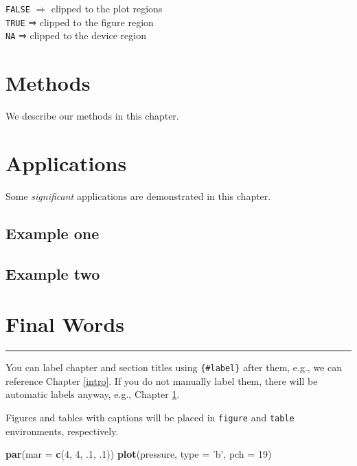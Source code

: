 \documentclass[]{book}
\newenvironment{Shaded}{\begin{snugshade}}{\end{snugshade}}
\newcommand{\KeywordTok}[1]{\textcolor[rgb]{0.13,0.29,0.53}{\textbf{#1}}}
\newcommand{\DataTypeTok}[1]{\textcolor[rgb]{0.13,0.29,0.53}{#1}}
\newcommand{\DecValTok}[1]{\textcolor[rgb]{0.00,0.00,0.81}{#1}}
\newcommand{\StringTok}[1]{\textcolor[rgb]{0.31,0.60,0.02}{#1}}
\newcommand{\NormalTok}[1]{#1}
\begin{document}
\texttt{FALSE} \(\Rightarrow\) clipped to the plot regions\\
\texttt{TRUE} ⇒ clipped to the figure region\\
\texttt{NA} ⇒ clipped to the device region

\chapter{Methods}\label{methods}

We describe our methods in this chapter.

\chapter{Applications}\label{applications}

Some \emph{significant} applications are demonstrated in this chapter.

\section{Example one}\label{example-one}

\section{Example two}\label{example-two}

\chapter{Final Words}\label{final-words}

\begin{center}\rule{0.5\linewidth}{\linethickness}\end{center}

You can label chapter and section titles using \texttt{\{\#label\}}
after them, e.g., we can reference Chapter \ref{intro}. If you do not
manually label them, there will be automatic labels anyway, e.g.,
Chapter \ref{methods}.

Figures and tables with captions will be placed in \texttt{figure} and
\texttt{table} environments, respectively.

\begin{Shaded}
\begin{Highlighting}[]
\KeywordTok{par}\NormalTok{(}\DataTypeTok{mar =} \KeywordTok{c}\NormalTok{(}\DecValTok{4}\NormalTok{, }\DecValTok{4}\NormalTok{, .}\DecValTok{1}\NormalTok{, .}\DecValTok{1}\NormalTok{))}
\KeywordTok{plot}\NormalTok{(pressure, }\DataTypeTok{type =} \StringTok{'b'}\NormalTok{, }\DataTypeTok{pch =} \DecValTok{19}\NormalTok{)}
\end{Highlighting}
\end{Shaded}
\end{document}

